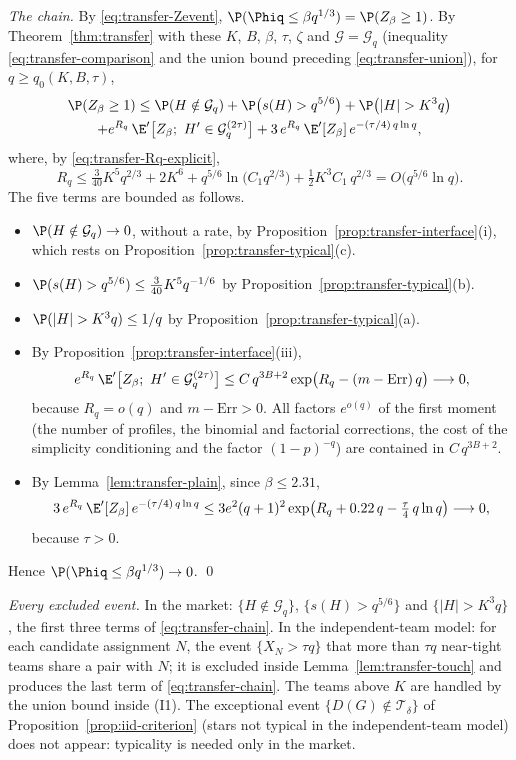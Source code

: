 \emph{The chain.} By \eqref{eq:transfer-Zevent},
$\P(\Phiq\le\beta q^{1/3})=\P(Z_\beta\ge1)$. By
Theorem~\ref{thm:transfer} with these $K$, $B$, $\beta$, $\tau$, $\zeta$ and
$\mathcal G=\mathcal G_q$ (inequality \eqref{eq:transfer-comparison} and the union bound
preceding \eqref{eq:transfer-union}), for $q\ge q_0(K,B,\tau)$,
\begin{multline}\label{eq:transfer-chain}
\P(Z_\beta\ge1)\le\P(H\notin\mathcal G_q)+\P\bigl(s(H)>q^{5/6}\bigr)+\P\bigl(|H|>K^3q\bigr)\\
+e^{R_q}\,\E'\bigl[Z_\beta;\ H'\in\mathcal G_q^{(2\tau)}\bigr]
+3\,e^{R_q}\,\E'[Z_\beta]\,e^{-(\tau/4)\,q\ln q},
\end{multline}
where, by \eqref{eq:transfer-Rq-explicit},
\[
R_q\le\tfrac{3}{40}K^5q^{2/3}+2K^6+q^{5/6}\ln\bigl(C_1q^{2/3}\bigr)+\tfrac12K^3C_1\,q^{2/3}
=O\bigl(q^{5/6}\ln q\bigr).
\]
The five terms are bounded as follows.
\begin{itemize}
\item $\P(H\notin\mathcal G_q)\to0$, without a rate, by
Proposition~\ref{prop:transfer-interface}(i), which rests on
Proposition~\ref{prop:transfer-typical}(c).
\item $\P(s(H)>q^{5/6})\le\tfrac{3}{40}K^5q^{-1/6}$ by
Proposition~\ref{prop:transfer-typical}(b).
\item $\P(|H|>K^3q)\le1/q$ by Proposition~\ref{prop:transfer-typical}(a).
\item By Proposition~\ref{prop:transfer-interface}(iii),
\[
e^{R_q}\,\E'\bigl[Z_\beta;\ H'\in\mathcal G_q^{(2\tau)}\bigr]
\le C\,q^{3B+2}\exp\bigl(R_q-(m-\mathrm{Err})\,q\bigr)\longrightarrow0,
\]
because $R_q=o(q)$ and $m-\mathrm{Err}>0$. All factors $e^{o(q)}$ of the first moment (the
number of profiles, the binomial and factorial corrections, the cost of the simplicity
conditioning and the factor $(1-p)^{-q}$) are contained in $C\,q^{3B+2}$.
\item By Lemma~\ref{lem:transfer-plain}, since $\beta\le2.31$,
\[
3\,e^{R_q}\,\E'[Z_\beta]\,e^{-(\tau/4)\,q\ln q}
\le3e^2(q+1)^2\exp\bigl(R_q+0.22\,q-\tfrac{\tau}{4}\,q\ln q\bigr)\longrightarrow0,
\]
because $\tau>0$.
\end{itemize}
Hence $\P(\Phiq\le\beta q^{1/3})\to0$. \qed

\emph{Every excluded event.} In the market: $\{H\notin\mathcal G_q\}$,
$\{s(H)>q^{5/6}\}$ and $\{|H|>K^3q\}$, the first three terms of \eqref{eq:transfer-chain}. In
the independent-team model: for each candidate assignment $N$, the event $\{X_N>\tau q\}$ that
more than $\tau q$ near-tight teams share a pair with $N$; it is excluded inside
Lemma~\ref{lem:transfer-touch} and produces the last term of \eqref{eq:transfer-chain}. The
teams above $K$ are handled by the union bound inside (I1). The exceptional event
$\{D(G)\notin\mathcal T_\delta\}$ of Proposition~\ref{prop:iid-criterion} (stars not typical in
the independent-team model) does not appear: typicality is needed only in the market.

